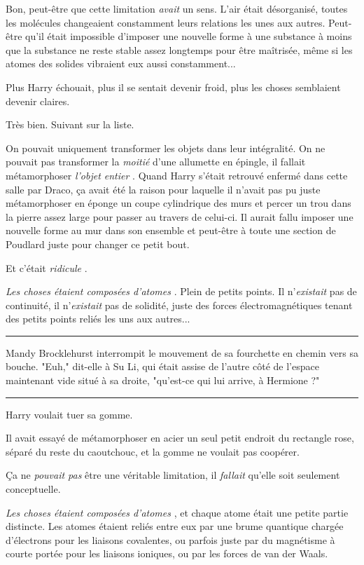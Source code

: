 Bon, peut-être que cette limitation \emph{avait}  un sens. L'air était désorganisé, toutes les molécules changeaient constamment leurs relations les unes aux autres. Peut-être qu'il était impossible d'imposer une nouvelle forme à une substance à moins que la substance ne reste stable assez longtemps pour être maîtrisée, même si les atomes des solides vibraient eux aussi constamment...

Plus Harry échouait, plus il se sentait devenir froid, plus les choses semblaient devenir claires.

Très bien. Suivant sur la liste.

On pouvait uniquement transformer les objets dans leur intégralité. On ne pouvait pas transformer la \emph{moitié}  d'une allumette en épingle, il fallait métamorphoser \emph{l'objet entier} . Quand Harry s'était retrouvé enfermé dans cette salle par Draco, ça avait été la raison pour laquelle il n'avait pas pu juste métamorphoser en éponge un coupe cylindrique des murs et percer un trou dans la pierre assez large pour passer au travers de celui-ci. Il aurait fallu imposer une nouvelle forme au mur dans son ensemble et peut-être à toute une section de Poudlard juste pour changer ce petit bout.

Et c'était \emph{ridicule} .

\emph{Les choses étaient composées d'atomes} . Plein de petits points. Il n'\emph{existait } pas de continuité, il n'\emph{existait}  pas de solidité, juste des forces électromagnétiques tenant des petits points reliés les uns aux autres...
\par\noindent\rule{\textwidth}{0.4pt}
Mandy Brocklehurst interrompit le mouvement de sa fourchette en chemin vers sa bouche. "Euh," dit-elle à Su Li, qui était assise de l'autre côté de l'espace maintenant vide situé à sa droite, "qu'est-ce qui lui arrive, à Hermione ?"
\par\noindent\rule{\textwidth}{0.4pt}
Harry voulait tuer sa gomme.

Il avait essayé de métamorphoser en acier un seul petit endroit du rectangle rose, séparé du reste du caoutchouc, et la gomme ne voulait pas coopérer.

Ça ne \emph{pouvait pas}  être une véritable limitation, il \emph{fallait}  qu'elle soit seulement conceptuelle.

\emph{Les choses étaient composées d'atomes} , et chaque atome était une petite partie distincte. Les atomes étaient reliés entre eux par une brume quantique chargée d'électrons pour les liaisons covalentes, ou parfois juste par du magnétisme à courte portée pour les liaisons ioniques, ou par les forces de van der Waals.

